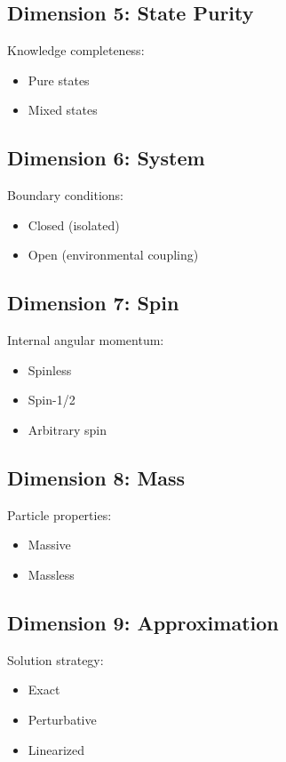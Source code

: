 \documentclass[12pt]{book}
\begin{document}
\subsection{Dimension 5: State Purity}

Knowledge completeness:
\begin{itemize}
  \item Pure states
  \item Mixed states
\end{itemize}

\subsection{Dimension 6: System}

Boundary conditions:
\begin{itemize}
  \item Closed (isolated)
  \item Open (environmental coupling)
\end{itemize}

\subsection{Dimension 7: Spin}

Internal angular momentum:
\begin{itemize}
  \item Spinless
  \item Spin-1/2
  \item Arbitrary spin
\end{itemize}

\subsection{Dimension 8: Mass}

Particle properties:
\begin{itemize}
  \item Massive
  \item Massless
\end{itemize}

\subsection{Dimension 9: Approximation}

Solution strategy:
\begin{itemize}
  \item Exact
  \item Perturbative
  \item Linearized
\end{itemize}
\end{document}
